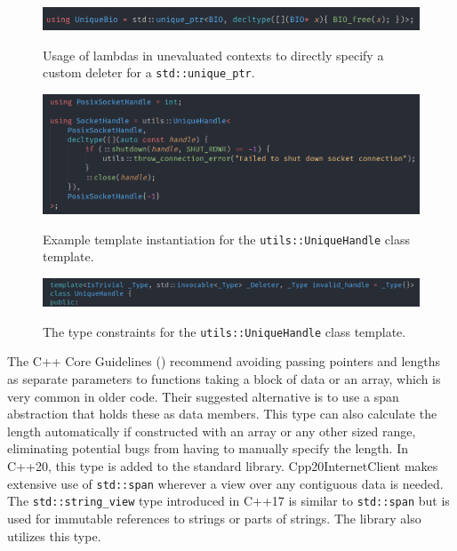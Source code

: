 \documentclass[12pt, a4paper]{article}
\begin{document}
\begin{figure}[ht]
	\centering
	\caption{Usage of lambdas in unevaluated contexts to directly specify a custom deleter for a \texttt{std::unique\_ptr}.}
	\includegraphics[width=\textwidth]{unevaluated_lambdas_unique_ptr}
	\label{fig:unevaluated_lambdas_unique_ptr}
\end{figure}

\begin{figure}[ht]
	\centering
	\caption{Example template instantiation for the \texttt{utils::UniqueHandle} class template.}
	\includegraphics[width=\textwidth]{unique_handle_example}
	\label{fig:unique_handle_example}
\end{figure}

\begin{figure}[ht]
	\centering
	\caption{The type constraints for the \texttt{utils::UniqueHandle} class template.}
	\includegraphics[width=\textwidth]{unique_handle_constraints}
	\label{fig:unique_handle_constraints}
\end{figure}

The C++ Core Guidelines (\cite{CppCoreGuidelines}) recommend avoiding passing pointers and lengths as separate parameters to functions taking a block of data or an array, which is very common in older code. Their suggested alternative is to use a span abstraction that holds these as data members. This type can also calculate the length automatically if constructed with an array or any other sized range, eliminating potential bugs from having to manually specify the length. In C++20, this type is added to the standard library. Cpp20InternetClient makes extensive use of \texttt{std::span} wherever a view over any contiguous data is needed. The \texttt{std::string\_view} type introduced in C++17 is similar to \texttt{std::span} but is used for immutable references to strings or parts of strings. The library also utilizes this type.
\end{document}
